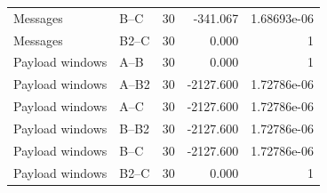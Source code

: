 \begin{table}[t]
\begin{tabular}{llrrr}
Messages & B--C & 30 & -341.067 & 1.68693e-06 \\
Messages & B2--C & 30 & 0.000 & 1 \\
Payload windows & A--B & 30 & 0.000 & 1 \\
Payload windows & A--B2 & 30 & -2127.600 & 1.72786e-06 \\
Payload windows & A--C & 30 & -2127.600 & 1.72786e-06 \\
Payload windows & B--B2 & 30 & -2127.600 & 1.72786e-06 \\
Payload windows & B--C & 30 & -2127.600 & 1.72786e-06 \\
Payload windows & B2--C & 30 & 0.000 & 1 \\
\bottomrule
\end{tabular}
\end{table}
